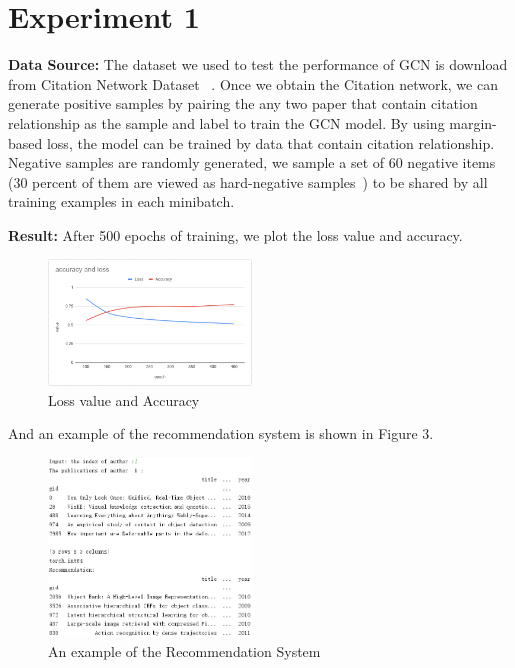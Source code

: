 \section{Experiment 1}
\label{sec-expt1, for recommendation task}

\textbf{Data Source: }The dataset we used to test the performance of GCN is download from Citation Network Dataset ~\cite{Tang:08KDD}. Once we obtain the Citation network, we can generate positive samples by pairing the any two paper that contain citation relationship as the sample and label to train the GCN model. By using margin-based loss, the model can be trained by data that contain citation relationship. Negative samples are randomly generated, we sample a set of 60 negative items (30 percent of them are viewed as hard-negative samples~\cite{pintest}) to be shared by all training examples in each minibatch.

\textbf{Result: }After 500 epochs of training, we plot the loss value and accuracy.
\begin{figure}[!htb]
    \centering
    \includegraphics[width=0.48\textwidth]{accandloss.png}
    \caption{Loss value and Accuracy}
    \label{fig:accandloss}
\end{figure}
And an example of the recommendation system is shown in Figure 3. 
\begin{figure}[!htb]
    \centering
    \includegraphics[width=0.48\textwidth]{demo.png}
    \caption{An example of the Recommendation System}
    \label{fig:demo}
\end{figure}